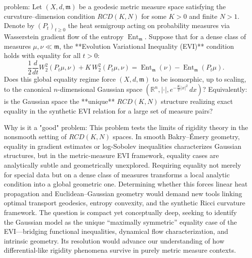problem:  
Let \((X,d,\mathfrak m)\) be a geodesic metric measure space satisfying the curvature–dimension condition \(RCD(K,N)\) for some \(K>0\) and finite \(N>1\). Denote by \((P_t)_{t\ge0}\) the heat semigroup acting on probability measures via Wasserstein gradient flow of the entropy \(\operatorname{Ent}_{\mathfrak m}\). Suppose that for a dense class of measures \(\mu,\nu \ll \mathfrak m\), the **Evolution Variational Inequality (EVI)** condition holds with equality for all \(t>0\):  
\[
\frac{1}{2}\frac{d}{dt}W_2^2(P_t\mu,\nu)
+K\,W_2^2(P_t\mu,\nu)
= \operatorname{Ent}_{\mathfrak m}(\nu)-\operatorname{Ent}_{\mathfrak m}(P_t\mu).
\]  
Does this global equality regime force \((X,d,\mathfrak m)\) to be isomorphic, up to scaling, to the canonical \(n\)-dimensional Gaussian space \((\mathbb R^n,|\cdot|, e^{-\frac K2|x|^2}\,dx)\)?  
Equivalently: is the Gaussian space the **unique** \(RCD(K,N)\) structure realizing exact equality in the synthetic EVI relation for a large set of measure pairs?

Why is it a "good" problem:  
This problem tests the limits of rigidity theory in the nonsmooth setting of \(RCD(K,N)\) spaces. In smooth Bakry–Émery geometry, equality in gradient estimates or log-Sobolev inequalities characterizes Gaussian structures, but in the metric-measure EVI framework, equality cases are analytically subtle and geometrically unexplored.  
Requiring equality not merely for special data but on a dense class of measures transforms a local analytic condition into a global geometric one. Determining whether this forces linear heat propagation and Euclidean–Gaussian geometry would demand new tools linking optimal transport geodesics, entropy convexity, and the synthetic Ricci curvature framework.  
The question is compact yet conceptually deep, seeking to identify the Gaussian model as the unique “maximally symmetric” equality case of the EVI—bridging functional inequalities, dynamical flow characterization, and intrinsic geometry. Its resolution would advance our understanding of how differential-like rigidity phenomena survive in purely metric measure contexts.